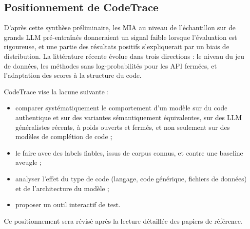 	\subsection{Positionnement de CodeTrace}\label{sec:ea-positionnement}
		D'après cette synthèse préliminaire, les MIA au niveau de l'échantillon sur de grands LLM pré-entraînés donneraient un signal faible lorsque l'évaluation est rigoureuse, et une partie des résultats positifs s'expliquerait par un biais de distribution. La littérature récente évolue dans trois directions : le niveau du jeu de données, les méthodes sans log-probabilités pour les API fermées, et l'adaptation des scores à la structure du code.

		CodeTrace vise la lacune suivante :
		\begin{itemize}
			\item comparer systématiquement le comportement d'un modèle sur du code authentique et sur des variantes sémantiquement équivalentes, sur des LLM généralistes récents, à poids ouverts et fermés, et non seulement sur des modèles de complétion de code ;
			\item le faire avec des labels fiables, issus de corpus connus, et contre une baseline aveugle ;
			\item analyser l'effet du type de code (langage, code générique, fichiers de données) et de l'architecture du modèle ;
			\item proposer un outil interactif de test.
		\end{itemize}
		Ce positionnement sera révisé après la lecture détaillée des papiers de référence.
